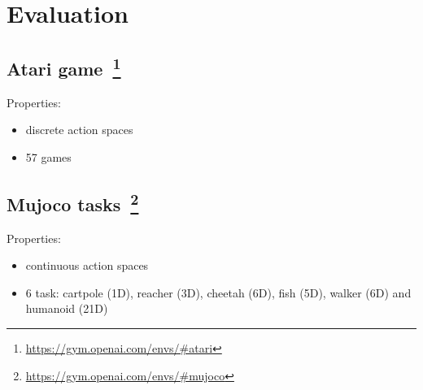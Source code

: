 \section{Evaluation}

\subsection{Atari game~\footnote{\url{https://gym.openai.com/envs/#atari}}}

Properties:
\begin{itemize}
\item discrete action spaces
\item 57 games
\end{itemize}

\subsection{Mujoco tasks~\footnote{\url{https://gym.openai.com/envs/#mujoco}}}

Properties:
\begin{itemize}
\item continuous action spaces
\item 6 task: cartpole (1D), reacher (3D), cheetah (6D), fish (5D), walker (6D) and humanoid (21D)
\end{itemize}
